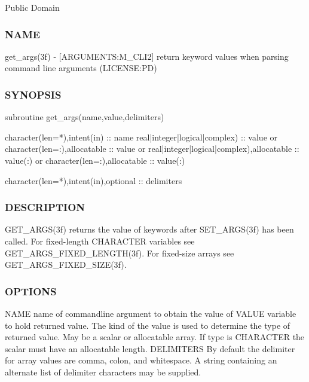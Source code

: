 Public Domain \subsubsection*{N\+A\+ME}

get\+\_\+args(3f) -\/ \mbox{[}A\+R\+G\+U\+M\+E\+N\+TS\+:M\+\_\+\+C\+L\+I2\mbox{]} return keyword values when parsing command line arguments (L\+I\+C\+E\+N\+SE\+:PD)

\subsubsection*{S\+Y\+N\+O\+P\+S\+IS}

\begin{DoxyVerb} subroutine get_args(name,value,delimiters)

  character(len=*),intent(in) :: name
  real|integer|logical|complex) :: value
     or
  character(len=:),allocatable :: value
     or
  real|integer|logical|complex),allocatable :: value(:)
     or
  character(len=:),allocatable :: value(:)

  character(len=*),intent(in),optional :: delimiters
\end{DoxyVerb}


\subsubsection*{D\+E\+S\+C\+R\+I\+P\+T\+I\+ON}

\begin{DoxyVerb} GET_ARGS(3f) returns the value of keywords after SET_ARGS(3f)
 has been called. For fixed-length CHARACTER variables
 see GET_ARGS_FIXED_LENGTH(3f). For fixed-size arrays see
 GET_ARGS_FIXED_SIZE(3f).
\end{DoxyVerb}


\subsubsection*{O\+P\+T\+I\+O\+NS}

\begin{DoxyVerb} NAME        name of commandline argument to obtain the value of
 VALUE       variable to hold returned value. The kind of the value
             is used to determine the type of returned value. May
             be a scalar or allocatable array. If type is CHARACTER
             the scalar must have an allocatable length.
 DELIMITERS  By default the delimiter for array values are comma,
             colon, and whitespace. A string containing an alternate
             list of delimiter characters may be supplied.
\end{DoxyVerb}


